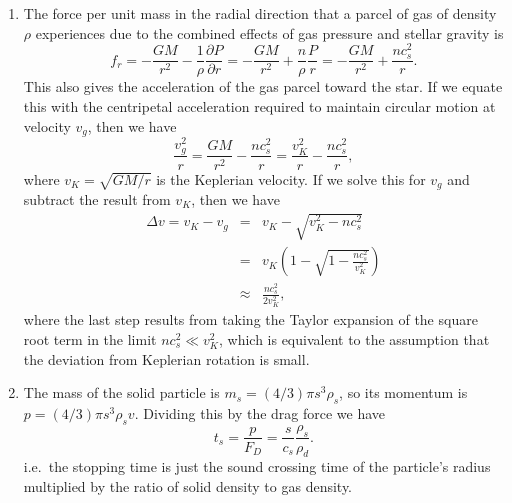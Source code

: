 \begin{enumerate}
\begin{enumerate}
\item The force per unit mass in the radial direction that a parcel of gas of density $\rho$ experiences due to the combined effects of gas pressure and stellar gravity is
\begin{displaymath}
f_r = -\frac{G M}{r^2} - \frac{1}{\rho}\frac{\partial P}{\partial r} = -\frac{GM}{r^2} + \frac{n}{\rho}\frac{P}{r} = -\frac{GM}{r^2} + \frac{n c_s^2}{r}.
\end{displaymath}
This also gives the acceleration of the gas parcel toward the star. If we equate this with the centripetal acceleration required to maintain circular motion at velocity $v_g$, then we have
\begin{displaymath}
\frac{v_g^2}{r} = \frac{GM}{r^2} - \frac{n c_s^2}{r} = \frac{v_K^2}{r} - \frac{n c_s^2}{r},
\end{displaymath}
where $v_K = \sqrt{GM/r}$ is the Keplerian velocity. If we solve this for $v_g$ and subtract the result from $v_K$, then we have
\begin{eqnarray*}
\Delta v = v_K - v_g & = & v_K - \sqrt{v_K^2 - n c_s^2} \\
& = & v_K \left(1 - \sqrt{1 - \frac{n c_s^2}{v_K^2}}\right) \\
& \approx & \frac{n c_s^2}{2 v_K^2},
\end{eqnarray*}
where the last step results from taking the Taylor expansion of the square root term in the limit $nc_s^2 \ll v_K^2$, which is equivalent to the assumption that the deviation from Keplerian rotation is small.

\item The mass of the solid particle is $m_s = (4/3)\pi s^3 \rho_s$, so its momentum is $p = (4/3)\pi s^3 \rho_s v$. Dividing this by the drag force we have
\begin{displaymath}
t_s = \frac{p}{F_D} = \frac{s}{c_s}\frac{\rho_s}{\rho_d}.
\end{displaymath}
i.e.\ the stopping time is just the sound crossing time of the particle's radius multiplied by the ratio of solid density to gas density.


\end{enumerate}
\end{enumerate}
